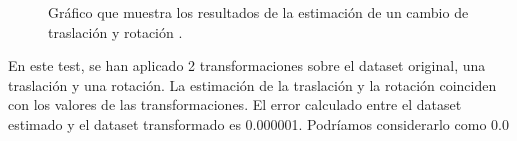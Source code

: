 \begin{figure}
\begin{center}
\hspace{0.5cm}

\end{center}

\caption{Gráfico que muestra los resultados de la estimación de un cambio de traslación y rotación .}
\end{figure}

En este test, se han aplicado 2 transformaciones sobre el dataset original, una traslación y una rotación.
La estimación de la traslación y la rotación coinciden con los valores de las transformaciones. El error calculado entre el dataset estimado y el dataset transformado es 0.000001.
Podríamos considerarlo como 0.0


